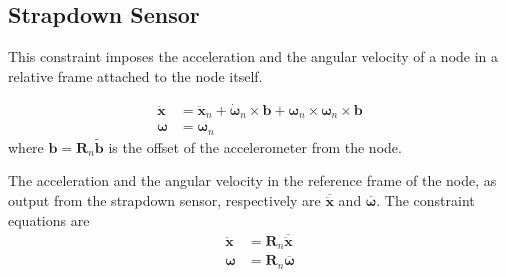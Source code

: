 \documentclass[10pt,fleqn,subeqn]{report}
\newcommand{\T}[1]{\bm{#1}}
\newcommand{\TT}[1]{\bm{#1}}
\begin{document}

\subsection{Strapdown Sensor}
This constraint imposes the acceleration and the angular velocity
of a node in a relative frame attached to the node itself.

\begin{subequations}
\begin{align}
	\ddot{\T{x}}
	&=
	\ddot{\T{x}}_n
	+
	\dot{\T{\omega}}_n \times \T{b}
	+
	\T{\omega}_n \times \T{\omega}_n \times \T{b}
	\\
	\T{\omega}
	&=
	\T{\omega}_n
\end{align}
\end{subequations}
where $\T{b} = \TT{R}_n \tilde{\T{b}}$ is the offset of the accelerometer
from the node.

The acceleration and the angular velocity in the reference frame
of the node, as output from the strapdown sensor, respectively are
$\overline{\ddot{\T{x}}}$ and $\overline{\T{\omega}}$.
The constraint equations are
\begin{subequations}
\begin{align}
	\ddot{\T{x}}
	&=
	\TT{R}_n \overline{\ddot{\T{x}}}
	\\
	\T{\omega}
	&=
	\TT{R}_n \overline{\T{\omega}}
\end{align}
\end{subequations}
\end{document}
